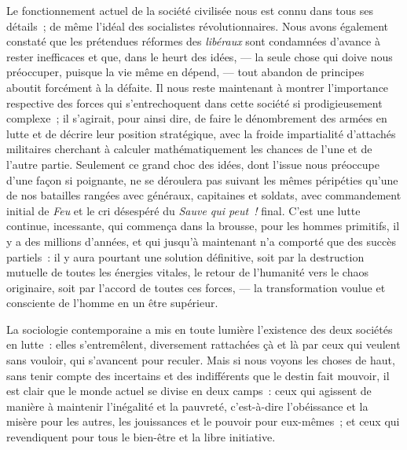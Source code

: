 \documentclass[french,twoside]{book} %
\newcommand\chaptercont{} %
\begin{document}
\chaptercont
\noindent Le fonctionnement actuel de la société civilisée nous est connu dans tous ses détails ; de même l’idéal des socialistes révolutionnaires. Nous avons également constaté que les prétendues réformes des \emph{libéraux} sont condamnées d’avance à rester inefficaces et que, dans le heurt des idées, — la seule chose qui doive nous préoccuper, puisque la vie même en dépend, — tout abandon de principes aboutit forcément à la défaite. Il nous reste maintenant à montrer  l’importance respective des forces qui s’entrechoquent dans cette société si prodigieusement complexe ; il s’agirait, pour ainsi dire, de faire le dénombrement des armées en lutte et de décrire leur position stratégique, avec la froide impartialité d’attachés militaires cherchant à calculer mathématiquement les chances de l’une et de l’autre partie. Seulement ce grand choc des idées, dont l’issue nous préoccupe d’une façon si poignante, ne se déroulera pas suivant les mêmes péripéties qu’une de nos batailles rangées avec généraux, capitaines et soldats, avec commandement initial de \emph{Feu} et le cri désespéré du \emph{Sauve qui peut !} final. C’est une lutte continue, incessante, qui commença dans la brousse, pour les hommes primitifs,  il y a des millions d’années, et qui jusqu’à maintenant n’a comporté que des succès partiels : il y aura pourtant une solution définitive, soit par la destruction mutuelle de toutes les énergies vitales, le retour de l’humanité vers le chaos originaire, soit par l’accord de toutes ces forces, — la transformation voulue et consciente de l’homme en un être supérieur.\par
La sociologie contemporaine a mis en toute lumière l’existence des deux sociétés en lutte : elles s’entremêlent, diversement rattachées çà et là par ceux qui veulent sans vouloir, qui s’avancent pour reculer. Mais si nous voyons les choses de haut, sans tenir compte des incertains et des indifférents que le destin fait mouvoir, il est clair que le monde  actuel se divise en deux camps : ceux qui agissent de manière à maintenir l’inégalité et la pauvreté, c’est-à-dire l’obéissance et la misère pour les autres, les jouissances et le pouvoir pour eux-mêmes ; et ceux qui revendiquent pour tous le bien-être et la libre initiative.\par
\end{document}
